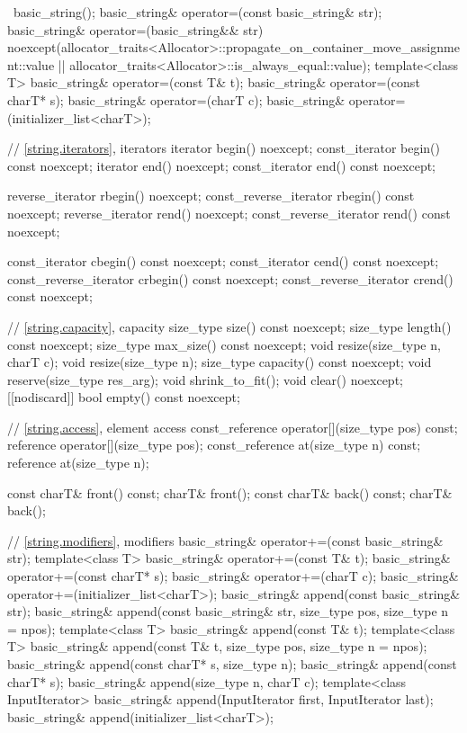 \begin{codeblock}
{{    ~basic_string();
    basic_string& operator=(const basic_string& str);
    basic_string& operator=(basic_string&& str)
      noexcept(allocator_traits<Allocator>::propagate_on_container_move_assignment::value ||
               allocator_traits<Allocator>::is_always_equal::value);
    template<class T>
      basic_string& operator=(const T& t);
    basic_string& operator=(const charT* s);
    basic_string& operator=(charT c);
    basic_string& operator=(initializer_list<charT>);

    // \ref{string.iterators}, iterators
    iterator       begin() noexcept;
    const_iterator begin() const noexcept;
    iterator       end() noexcept;
    const_iterator end() const noexcept;

    reverse_iterator       rbegin() noexcept;
    const_reverse_iterator rbegin() const noexcept;
    reverse_iterator       rend() noexcept;
    const_reverse_iterator rend() const noexcept;

    const_iterator         cbegin() const noexcept;
    const_iterator         cend() const noexcept;
    const_reverse_iterator crbegin() const noexcept;
    const_reverse_iterator crend() const noexcept;

    // \ref{string.capacity}, capacity
    size_type size() const noexcept;
    size_type length() const noexcept;
    size_type max_size() const noexcept;
    void resize(size_type n, charT c);
    void resize(size_type n);
    size_type capacity() const noexcept;
    void reserve(size_type res_arg);
    void shrink_to_fit();
    void clear() noexcept;
    [[nodiscard]] bool empty() const noexcept;

    // \ref{string.access}, element access
    const_reference operator[](size_type pos) const;
    reference       operator[](size_type pos);
    const_reference at(size_type n) const;
    reference       at(size_type n);

    const charT& front() const;
    charT&       front();
    const charT& back() const;
    charT&       back();

    // \ref{string.modifiers}, modifiers
    basic_string& operator+=(const basic_string& str);
    template<class T>
      basic_string& operator+=(const T& t);
    basic_string& operator+=(const charT* s);
    basic_string& operator+=(charT c);
    basic_string& operator+=(initializer_list<charT>);
    basic_string& append(const basic_string& str);
    basic_string& append(const basic_string& str, size_type pos, size_type n = npos);
    template<class T>
      basic_string& append(const T& t);
    template<class T>
      basic_string& append(const T& t, size_type pos, size_type n = npos);
    basic_string& append(const charT* s, size_type n);
    basic_string& append(const charT* s);
    basic_string& append(size_type n, charT c);
    template<class InputIterator>
      basic_string& append(InputIterator first, InputIterator last);
    basic_string& append(initializer_list<charT>);

}}
\end{codeblock}
